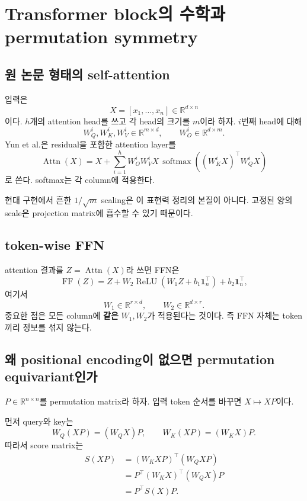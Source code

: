 \documentclass[11pt,a4paper,oneside,openany]{memoir}
\newcommand{\R}{\mathbb{R}}
\newcommand{\one}{\mathbf{1}}
\newcommand{\softmax}{\operatorname{softmax}}
\newcommand{\ReLU}{\operatorname{ReLU}}
\newcommand{\Attn}{\operatorname{Attn}}
\newcommand{\FF}{\operatorname{FF}}
\theoremstyle{definition}
\begin{document}
\chapter{Transformer block의 수학과 permutation symmetry}

\section{원 논문 형태의 self-attention}

입력은
\[
X=[x_1,\dots,x_n]\in\R^{d\times n}
\]
이다. $h$개의 attention head를 쓰고 각 head의 크기를 $m$이라 하자.
$i$번째 head에 대해
\[
W_Q^i,W_K^i,W_V^i\in\R^{m\times d},
\qquad
W_O^i\in\R^{d\times m}.
\]
Yun et al.은 residual을 포함한 attention layer를
\[
\Attn(X)
=
X+\sum_{i=1}^h
W_O^iW_V^iX\,
\softmax\!\left((W_K^iX)^\top W_Q^iX\right)
\]
로 쓴다. softmax는 각 column에 적용한다.

현대 구현에서 흔한 $1/\sqrt m$ scaling은 이 표현력 정리의 본질이 아니다. 고정된 양의 scale은 projection matrix에 흡수할 수 있기 때문이다.

\section{token-wise FFN}

attention 결과를 $Z=\Attn(X)$라 쓰면 FFN은
\[
\FF(Z)
=
Z+W_2\ReLU(W_1Z+b_1\one_n^\top)+b_2\one_n^\top,
\]
여기서
\[
W_1\in\R^{r\times d},
\qquad
W_2\in\R^{d\times r}.
\]
중요한 점은 모든 column에 \textbf{같은} $W_1,W_2$가 적용된다는 것이다.
즉 FFN 자체는 token끼리 정보를 섞지 않는다.

\section{왜 positional encoding이 없으면 permutation equivariant인가}

$P\in\R^{n\times n}$를 permutation matrix라 하자. 입력 token 순서를 바꾸면 $X\mapsto XP$이다.

먼저 query와 key는
\[
W_Q(XP)=(W_QX)P,
\qquad
W_K(XP)=(W_KX)P.
\]
따라서 score matrix는
\begin{align*}
S(XP)
&=(W_KXP)^\top(W_QXP)\\
&=P^\top(W_KX)^\top(W_QX)P\\
&=P^\top S(X)P.
\end{align*}
\end{document}
